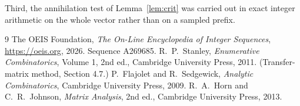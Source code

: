 \documentclass[11pt,a4paper]{article}
\theoremstyle{plain}
\theoremstyle{definition}
\begin{document}
Third, the annihilation test of Lemma~\ref{lem:crit} was carried out in exact integer
arithmetic on the whole vector rather than on a sampled prefix.

\begin{thebibliography}{9}
 The OEIS Foundation, \emph{The On-Line Encyclopedia of Integer
Sequences}, \url{https://oeis.org}, 2026. Sequence A269685.
 R.~P.~Stanley, \emph{Enumerative Combinatorics}, Volume 1, 2nd ed.,
Cambridge University Press, 2011. (Transfer-matrix method, Section 4.7.)
 P.~Flajolet and R.~Sedgewick, \emph{Analytic Combinatorics}, Cambridge
University Press, 2009.
 R.~A.~Horn and C.~R.~Johnson, \emph{Matrix Analysis}, 2nd ed., Cambridge
University Press, 2013.
\end{thebibliography}
\end{document}

